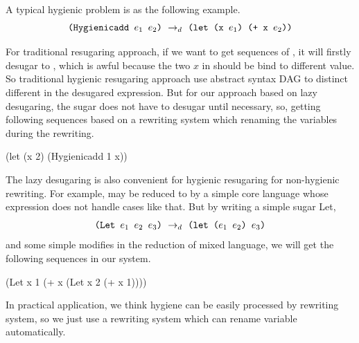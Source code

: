 A typical hygienic problem is as the following example.
\[
\texttt{(Hygienicadd $e_1$ $e_2$)} ~\rightarrow_d~ \texttt{(let (x $e_1$) (+ x $e_2$))}
\]

For traditional resugaring approach, if we want to get sequences of , it will firstly desugar to , which is awful because the two $x$ in  should be bind to different value. So traditional hygienic resugaring approach use abstract syntax DAG to distinct different  in the desugared expression. But for our approach based on lazy desugaring, the  sugar does not have to desugar until necessary, so, getting following sequences based on a  rewriting system which renaming the variables during the rewriting.

\begin{Codes}
    (let (x 2) (Hygienicadd 1 x))
\end{Codes}

The lazy desugaring is also convenient for hygienic resugaring for non-hygienic rewriting. For example,  may be reduced to  by a simple core language whose  expression does not handle cases like that. But by writing a simple sugar Let,
\[\texttt{(Let~$e_1$~$e_2$~$e_3$)} ~\rightarrow_d~ \texttt{(let~($e_1$~$e_2$)~$e_3$)}\]
and some simple modifies in the reduction of mixed language, we will get the following sequences in our system.
\begin{Codes}
    (Let x 1 (+ x (Let x 2 (+ x 1))))
\end{Codes}

In practical application, we think hygiene can be easily processed by rewriting system, so we just use a rewriting system which can rename variable automatically. 

